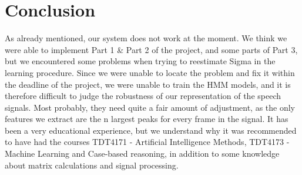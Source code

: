 \documentclass[titlepage]{article}
\begin{document}
\section{Conclusion}
        As already mentioned, our system does not work at the moment. We think we were able to implement Part 1 & Part 2 of the project, and some parts of Part 3, but we encountered some problems when trying to reestimate Sigma in the learning procedure. Since we were unable to locate the problem and fix it within the deadline of the project, we were unable to train the HMM models, and it is therefore difficult to judge the robustness of our representation of the speech signals. Most probably, they need quite a fair amount of adjustment, as the only features we extract are the n largest peaks for every frame in the signal. It has been a very educational experience, but we understand why it was recommended to have had the courses TDT4171 - Artificial Intelligence Methods, TDT4173 - Machine Learning and Case-based reasoning, in addition to some knowledge about matrix calculations and signal processing.
\end{document}
